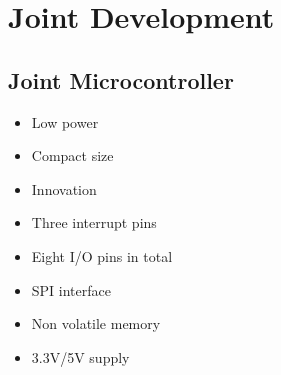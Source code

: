 \section{Joint Development} %
\label{sec:joint_development}


\subsection{Joint Microcontroller} %
\label{sub:joint_microcontroller}



\begin{itemize}
	\item Low power
	\item Compact size
	\item Innovation
	\item Three interrupt pins
	\item Eight I/O pins in total 
	\item SPI interface
	\item Non volatile memory
	\item 3.3V/5V supply
\end{itemize}

